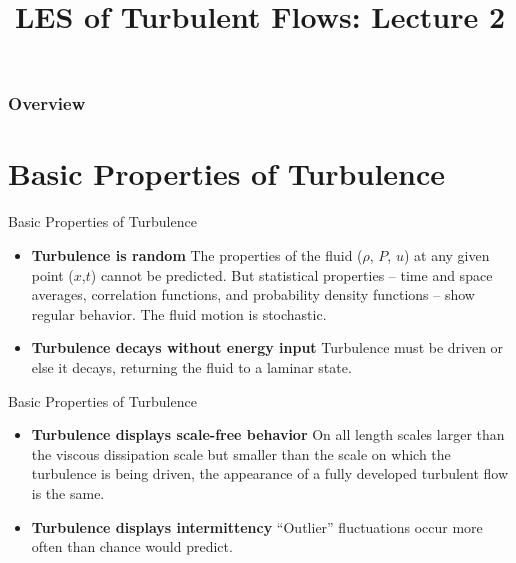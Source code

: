 
\title{LES of Turbulent Flows: Lecture 2}



\begin{frame} 
  \titlepage
\end{frame}


\begin{frame}
\frametitle{Overview}
\tableofcontents
\end{frame}

\section{Basic Properties of Turbulence} %
\begin{frame}{Basic Properties of Turbulence}
\begin{itemize}
\item \textbf{Turbulence is random} \newline The properties of the fluid ($\rho$, $P$, $u$) at any given point ($x$,$t$) cannot be predicted. But statistical properties – time and space averages, correlation functions, and probability density functions – show regular behavior. The fluid motion is stochastic.
\item \textbf{Turbulence decays without energy input} \newline Turbulence must be driven or else it decays, returning the fluid to a laminar state.
\end{itemize}
\end{frame}


\begin{frame}{Basic Properties of Turbulence}
\begin{itemize}
\item \textbf{Turbulence displays scale-free behavior} \newline On all length scales larger than the viscous dissipation scale but smaller than the scale on which the turbulence is being driven, the appearance of a fully developed turbulent flow is the same.
\item \textbf{Turbulence displays intermittency} \newline ``Outlier'' fluctuations occur more often than chance would predict.
\end{itemize}
\end{frame}


